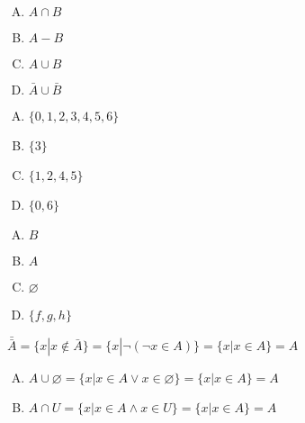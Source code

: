 {{        %
        \begin{practices}
            \begin{enumerate}[A.]
                \item $A \cap B$
                \item $A - B$
                \item $A \cup B$
                \item $\bar{A} \cup \bar{B}$
            \end{enumerate}
        \end{practices}

        \begin{practices}
            \begin{enumerate}[A.]
                \item $\{0, 1, 2, 3, 4, 5, 6\}$
                \item $\{3\}$
                \item $\{1, 2, 4, 5\}$
                \item $\{0, 6\}$
            \end{enumerate}
        \end{practices}

        \begin{practices}
            \begin{enumerate}[A.]
                \item $B$
                \item $A$
                \item $\varnothing$
                \item $\{f, g, h\}$
            \end{enumerate}
        \end{practices}

        \begin{practices}
            $\bar{\bar{A}} = \{x | x \notin \bar{A}\} = \{x | \neg (\neg x \in A)\} = \{x | x \in A\} = A$
        \end{practices}

        \begin{practices}
            \begin{enumerate}[A.]
                \item $A \cup \varnothing = \{x | x \in A \vee x \in \varnothing\} = \{x | x \in A\} = A$
                \item $A \cap U = \{x | x \in A \wedge x \in U\} = \{x | x \in A\} = A$
            \end{enumerate}
        \end{practices}

}}
